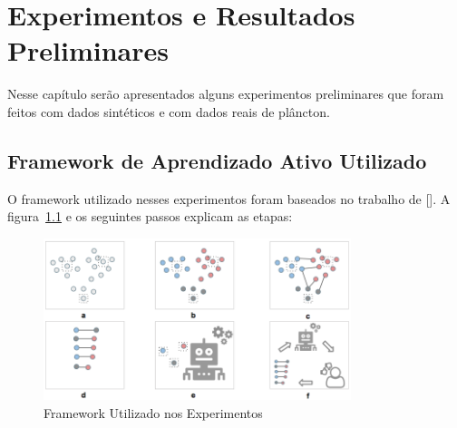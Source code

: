 \chapter{Experimentos e Resultados Preliminares}
\label{cap:Experimentos_Resultados}


Nesse capítulo serão apresentados alguns experimentos preliminares que foram feitos com dados sintéticos e com dados reais de plâncton. 

\section{Framework de Aprendizado Ativo Utilizado}
\label{sec:framework_al}

O framework utilizado nesses experimentos foram baseados no trabalho de [\cite{saito2014active}]. A figura~\ref{fig:priscila_algoritmo} e os seguintes passos explicam as etapas:

\begin{figure}
  \centering
  \includegraphics[width=0.8\textwidth]{figures/priscila_algoritmo.png}
  \caption{Framework Utilizado nos Experimentos}
  \label{fig:priscila_algoritmo}
\end{figure}




